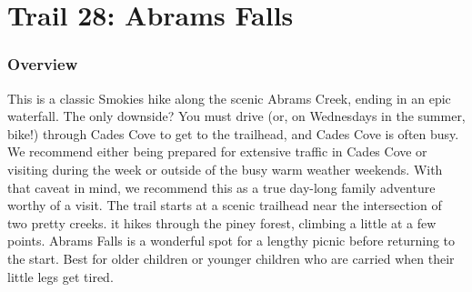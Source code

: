 \documentclass[
  letterpaper,
  DIV=11,
  numbers=noendperiod]{scrreprt}
\begin{document}
\chapter{Trail 28: Abrams Falls}\label{trail-28-abrams-falls}

\subsection{Overview}\label{overview-28}

This is a classic Smokies hike along the scenic Abrams Creek, ending in
an epic waterfall. The only downside? You must drive (or, on Wednesdays
in the summer, bike!) through Cades Cove to get to the trailhead, and
Cades Cove is often busy. We recommend either being prepared for
extensive traffic in Cades Cove or visiting during the week or outside
of the busy warm weather weekends. With that caveat in mind, we
recommend this as a true day-long family adventure worthy of a visit.
The trail starts at a scenic trailhead near the intersection of two
pretty creeks. it hikes through the piney forest, climbing a little at a
few points. Abrams Falls is a wonderful spot for a lengthy picnic before
returning to the start. Best for older children or younger children who
are carried when their little legs get tired.
\end{document}
